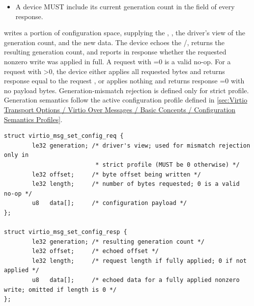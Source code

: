 \begin{itemize}
  \item A device MUST include its current generation count in the
         field of every  response.
\end{itemize}


 writes a portion of configuration space, supplying the
, , the driver's view of the generation count, and
the new data. The device echoes the /, returns the
resulting generation count, and reports in response  whether the
requested nonzero write was applied in full. A request with =0 is
a valid no-op. For a request with >0, the device either applies
all requested bytes and returns response  equal to the request
, or applies nothing and returns response =0 with no
payload bytes.
Generation-mismatch rejection is defined only for strict profile.
Generation semantics follow the active configuration profile defined in
\ref{sec:Virtio Transport Options / Virtio Over Messages / Basic Concepts / Configuration Semantics Profiles}.

\begin{lstlisting}
struct virtio_msg_set_config_req {
        le32 generation; /* driver's view; used for mismatch rejection only in
                          * strict profile (MUST be 0 otherwise) */
        le32 offset;     /* byte offset being written */
        le32 length;     /* number of bytes requested; 0 is a valid no-op */
        u8   data[];     /* configuration payload */
};

struct virtio_msg_set_config_resp {
        le32 generation; /* resulting generation count */
        le32 offset;     /* echoed offset */
        le32 length;     /* request length if fully applied; 0 if not applied */
        u8   data[];     /* echoed data for a fully applied nonzero write; omitted if length is 0 */
};
\end{lstlisting}

